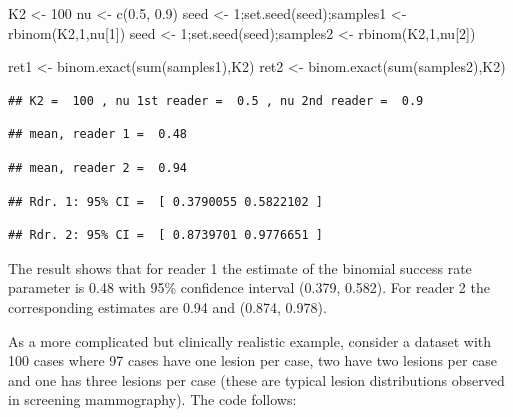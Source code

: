 \documentclass[
]{book}
\newenvironment{Shaded}{\begin{snugshade}}{\end{snugshade}}
\newcommand{\DecValTok}[1]{\textcolor[rgb]{0.00,0.00,0.81}{#1}}
\newcommand{\FloatTok}[1]{\textcolor[rgb]{0.00,0.00,0.81}{#1}}
\newcommand{\FunctionTok}[1]{\textcolor[rgb]{0.00,0.00,0.00}{#1}}
\newcommand{\NormalTok}[1]{#1}
\newcommand{\OtherTok}[1]{\textcolor[rgb]{0.56,0.35,0.01}{#1}}
\begin{document}
\begin{Shaded}
\begin{Highlighting}[]
\NormalTok{K2 }\OtherTok{\textless{}{-}} \DecValTok{100}
\NormalTok{nu }\OtherTok{\textless{}{-}} \FunctionTok{c}\NormalTok{(}\FloatTok{0.5}\NormalTok{, }\FloatTok{0.9}\NormalTok{)}
\NormalTok{seed }\OtherTok{\textless{}{-}} \DecValTok{1}\NormalTok{;}\FunctionTok{set.seed}\NormalTok{(seed);samples1 }\OtherTok{\textless{}{-}} \FunctionTok{rbinom}\NormalTok{(K2,}\DecValTok{1}\NormalTok{,nu[}\DecValTok{1}\NormalTok{])}
\NormalTok{seed }\OtherTok{\textless{}{-}} \DecValTok{1}\NormalTok{;}\FunctionTok{set.seed}\NormalTok{(seed);samples2 }\OtherTok{\textless{}{-}} \FunctionTok{rbinom}\NormalTok{(K2,}\DecValTok{1}\NormalTok{,nu[}\DecValTok{2}\NormalTok{])}

\NormalTok{ret1 }\OtherTok{\textless{}{-}} \FunctionTok{binom.exact}\NormalTok{(}\FunctionTok{sum}\NormalTok{(samples1),K2)}
\NormalTok{ret2 }\OtherTok{\textless{}{-}} \FunctionTok{binom.exact}\NormalTok{(}\FunctionTok{sum}\NormalTok{(samples2),K2)}
\end{Highlighting}
\end{Shaded}

\begin{verbatim}
## K2 =  100 , nu 1st reader =  0.5 , nu 2nd reader =  0.9
\end{verbatim}

\begin{verbatim}
## mean, reader 1 =  0.48
\end{verbatim}

\begin{verbatim}
## mean, reader 2 =  0.94
\end{verbatim}

\begin{verbatim}
## Rdr. 1: 95% CI =  [ 0.3790055 0.5822102 ]
\end{verbatim}

\begin{verbatim}
## Rdr. 2: 95% CI =  [ 0.8739701 0.9776651 ]
\end{verbatim}

The result shows that for reader 1 the estimate of the binomial success rate parameter is 0.48 with 95\% confidence interval (0.379, 0.582). For reader 2 the corresponding estimates are 0.94 and (0.874, 0.978).

As a more complicated but clinically realistic example, consider a dataset with 100 cases where 97 cases have one lesion per case, two have two lesions per case and one has three lesions per case (these are typical lesion distributions observed in screening mammography). The code follows:
\end{document}
